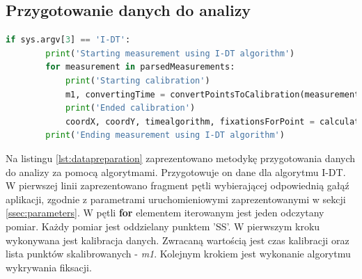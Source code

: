 \subsection{Przygotowanie danych do analizy}
\label{ssec:Dataanalysis}
\begin{lstlisting}[language=Python, caption=Przygotowanie danych do dalszej analizy, label={lst:datapreparation}]
        if sys.argv[3] == 'I-DT':
        print('Starting measurement using I-DT algorithm')
        for measurement in parsedMeasurements:
            print('Starting calibration')
            m1, convertingTime = convertPointsToCalibration(measurement)
            print('Ended calibration')
            coordX, coordY, timealgorithm, fixationsForPoint = calculateIdtAlgorithm(m1)
        print('Ending measurement using I-DT algorithm')
\end{lstlisting}
Na listingu \ref{lst:datapreparation} zaprezentowano metodykę przygotowania danych do analizy za pomocą algorytmami. Przygotowuje on dane dla algorytmu I-DT. W pierwszej linii zaprezentowano fragment pętli wybierającej odpowiednią gałąź aplikacji, zgodnie z parametrami uruchomieniowymi zaprezentowanymi w sekcji \ref{ssec:parameters}. W pętli \textbf{for} elementem iterowanym jest jeden odczytany pomiar. Każdy pomiar jest oddzielany punktem 'SS'. W pierwszym kroku wykonywana jest kalibracja danych. Zwracaną wartością jest czas kalibracji oraz lista punktów skalibrowanych - \emph{m1}. Kolejnym krokiem jest wykonanie algorytmu wykrywania fiksacji.
